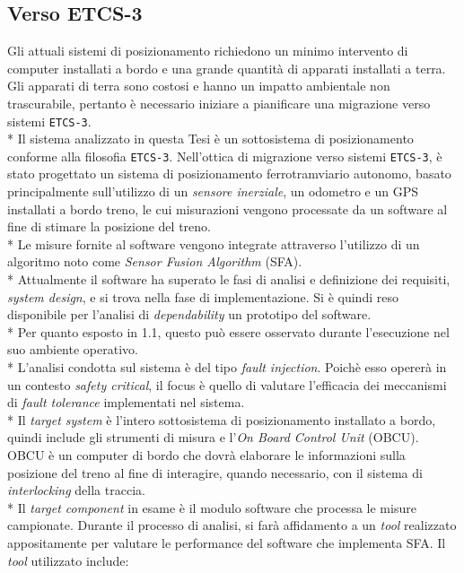 \subsection{Verso ETCS-3}
Gli attuali sistemi di posizionamento richiedono un minimo intervento di computer installati a bordo e una grande quantit\`a di apparati installati a terra. Gli apparati di terra sono costosi e hanno un impatto ambientale non trascurabile, pertanto \`e necessario iniziare a pianificare una migrazione verso sistemi \texttt{ETCS-3}. \cite{market}\\*
Il sistema analizzato in questa Tesi \`e un sottosistema di posizionamento conforme alla filosofia \texttt{ETCS-3}.
Nell'ottica di migrazione verso sistemi \texttt{ETCS-3}, \`e stato progettato un sistema di posizionamento ferrotramviario autonomo, basato principalmente sull'utilizzo di un \emph{sensore inerziale}, un odometro e un GPS installati a bordo treno, le cui misurazioni vengono processate da un software al fine di stimare la posizione del treno. \cite{svolta}\\*
Le misure fornite al software vengono integrate attraverso l'utilizzo di un algoritmo noto come \emph{Sensor Fusion Algorithm} (SFA). \cite{sfarailway}\\*
Attualmente il software ha superato le fasi di analisi e definizione dei requisiti, \emph{system design}, e si trova nella fase di implementazione. Si \`e quindi reso disponibile per l'analisi di \emph{dependability} un prototipo del software.\\*
Per quanto esposto in 1.1, questo pu\`o essere osservato durante l'esecuzione nel suo ambiente operativo.\\*
L'analisi condotta sul sistema \`e del tipo \emph{fault injection}. Poich\`e esso operer\`a in un contesto \emph{safety critical}, il focus \`e quello di valutare l'efficacia dei meccanismi di \emph{fault tolerance} implementati nel sistema.\\*
Il \emph{target system} \`e l'intero sottosistema di posizionamento installato a bordo, quindi include gli strumenti di misura e l'\emph{On Board Control Unit} (OBCU). OBCU \`e un computer di bordo che dovr\`a elaborare le informazioni sulla posizione del treno al fine di interagire, quando necessario, con il sistema di \emph{interlocking} della traccia.\\*
Il \emph{target component} in esame \`e il modulo software che processa le misure campionate. Durante il processo di analisi, si far\`a affidamento a un \emph{tool} realizzato appositamente per valutare le performance del software che implementa SFA. Il \emph{tool} utilizzato include:
